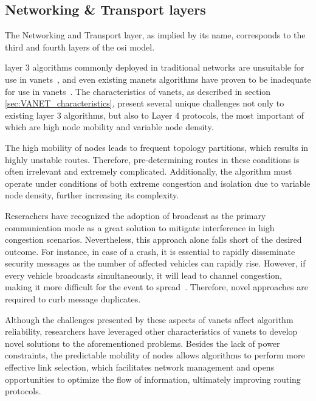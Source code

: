 \subsection[Networking \& Transport layers]{Networking \& Transport layers}
\label{subsec:networking_transport_layers}
The Networking and Transport layer, as implied by its name, corresponds to the third and fourth layers of the \gls{osi} model.

layer 3 algorithms commonly deployed in traditional networks are unsuitable for use in \glspl{vanet}~\cite{toor_vehicle_2008}, and even existing \glspl{manet} algorithms have proven to be inadequate for use in \glspl{vanet}~\cite{liang_vehicular_2015}. The characteristics of \glspl{vanet}, as described in section \ref{sec:VANET_characteristics}, present several unique challenges not only to existing layer 3 algorithms, but also to Layer 4 protocols, the most important of which are high node mobility and variable node density.

The high mobility of nodes leads to frequent topology partitions, which results in highly unstable routes. Therefore, pre-determining routes in these conditions is often irrelevant and extremely complicated. Additionally, the algorithm must operate under conditions of both extreme congestion and isolation due to variable node density, further increasing its complexity.

Reserachers have recognized the adoption of broadcast as the primary communication mode as a great solution to mitigate interference in high congestion scenarios. Nevertheless, this approach alone falls short of the desired outcome. For instance, in case of a crash, it is essential to rapidly disseminate security messages as the number of affected vehicles can rapidly rise. However, if every vehicle broadcasts simultaneously, it will lead to channel congestion, making it more difficult for the event to spread~\cite{toor_vehicle_2008}. Therefore, novel approaches are required to curb message duplicates. 

Although the challenges presented by these aspects of \glspl{vanet} affect algorithm reliability, researchers have leveraged other characteristics of \glspl{vanet} to develop novel solutions to the aforementioned problems. Besides the lack of power constraints, the predictable mobility of nodes allows algorithms to perform more effective link selection, which facilitates network management and opens opportunities to optimize the flow of information, ultimately improving routing protocols.

